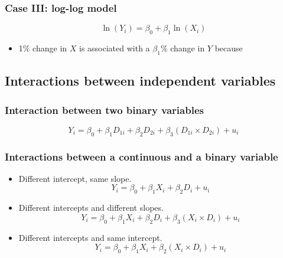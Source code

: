 \documentclass[a4paper,10pt]{article}
\begin{document}
\subsubsection*{Case III: log-log model}
\label{sec:org51a5347}
\begin{equation}
\label{eq:log-log}
\ln(Y_i) = \beta_0 + \beta_1 \ln(X_i)
\end{equation}
\begin{itemize}
\item 1\% change in \(X\) is associated with a \(\beta_{\text{1}}\)\% change in \(Y\)
because
\end{itemize}

\subsection{Interactions between independent variables}
\label{sec:orgc165caf}
\subsubsection*{Interaction between two binary variables}
\label{sec:orgac7488b}
\begin{equation}
\label{eq:interact-dd}
Y_i = \beta_0 + \beta_1 D_{1i} + \beta_2 D_{2i} + \beta_3 (D_{1i} \times D_{2i}) + u_i
\end{equation}

\subsubsection*{Interactions between a continuous and a binary variable}
\label{sec:org07d74fd}
\begin{itemize}
\item Different intercept, same slope.
\label{sec:orgd180f3b}
\begin{equation}
\label{eq:interact-dx-a}
Y_i = \beta_0 + \beta_1 X_i + \beta_2 D_i + u_i
\end{equation}
\item Different intercepts and different slopes.
\label{sec:orgc199c56}
\begin{equation}
\label{eq:interact-dx-b}
Y_i = \beta_0 + \beta_1 X_i + \beta_2 D_i + \beta_3 (X_i \times D_i) + u_i
\end{equation}
\item Different intercepts and same intercept.
\label{sec:org36ce8eb}
\begin{equation}
\label{eq:interact-dx-c}
Y_i = \beta_0 + \beta_1 X_i + \beta_2 (X_i \times D_i) + u_i
\end{equation}
\end{itemize}
\end{document}
